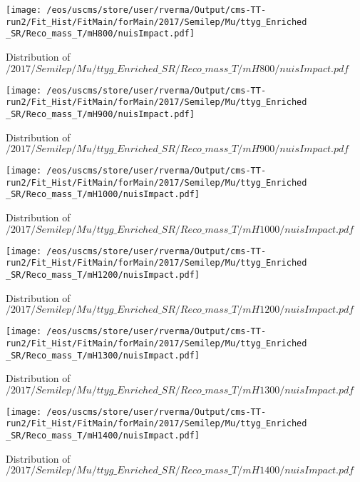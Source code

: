 \begin{figure}
\centering
\texttt{[image: /eos/uscms/store/user/rverma/Output/cms-TT-run2/Fit\_Hist/FitMain/forMain/2017/Semilep/Mu/ttyg\_Enriched\_SR/Reco\_mass\_T/mH800/nuisImpact.pdf]}
\caption{Distribution of $/2017/Semilep/Mu/ttyg\_Enriched\_SR/Reco\_mass\_T/mH800/nuisImpact.pdf$}
\end{figure}

\begin{figure}
\centering
\texttt{[image: /eos/uscms/store/user/rverma/Output/cms-TT-run2/Fit\_Hist/FitMain/forMain/2017/Semilep/Mu/ttyg\_Enriched\_SR/Reco\_mass\_T/mH900/nuisImpact.pdf]}
\caption{Distribution of $/2017/Semilep/Mu/ttyg\_Enriched\_SR/Reco\_mass\_T/mH900/nuisImpact.pdf$}
\end{figure}

\begin{figure}
\centering
\texttt{[image: /eos/uscms/store/user/rverma/Output/cms-TT-run2/Fit\_Hist/FitMain/forMain/2017/Semilep/Mu/ttyg\_Enriched\_SR/Reco\_mass\_T/mH1000/nuisImpact.pdf]}
\caption{Distribution of $/2017/Semilep/Mu/ttyg\_Enriched\_SR/Reco\_mass\_T/mH1000/nuisImpact.pdf$}
\end{figure}

\begin{figure}
\centering
\texttt{[image: /eos/uscms/store/user/rverma/Output/cms-TT-run2/Fit\_Hist/FitMain/forMain/2017/Semilep/Mu/ttyg\_Enriched\_SR/Reco\_mass\_T/mH1200/nuisImpact.pdf]}
\caption{Distribution of $/2017/Semilep/Mu/ttyg\_Enriched\_SR/Reco\_mass\_T/mH1200/nuisImpact.pdf$}
\end{figure}

\begin{figure}
\centering
\texttt{[image: /eos/uscms/store/user/rverma/Output/cms-TT-run2/Fit\_Hist/FitMain/forMain/2017/Semilep/Mu/ttyg\_Enriched\_SR/Reco\_mass\_T/mH1300/nuisImpact.pdf]}
\caption{Distribution of $/2017/Semilep/Mu/ttyg\_Enriched\_SR/Reco\_mass\_T/mH1300/nuisImpact.pdf$}
\end{figure}

\begin{figure}
\centering
\texttt{[image: /eos/uscms/store/user/rverma/Output/cms-TT-run2/Fit\_Hist/FitMain/forMain/2017/Semilep/Mu/ttyg\_Enriched\_SR/Reco\_mass\_T/mH1400/nuisImpact.pdf]}
\caption{Distribution of $/2017/Semilep/Mu/ttyg\_Enriched\_SR/Reco\_mass\_T/mH1400/nuisImpact.pdf$}
\end{figure}

